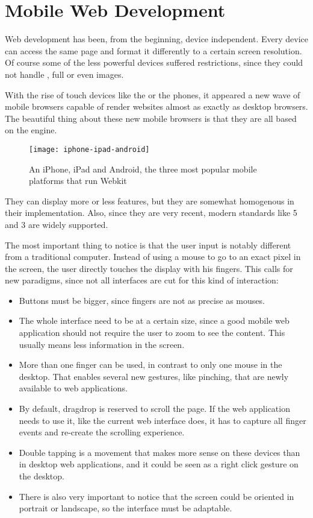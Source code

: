\section{Mobile Web Development} %
\label{sec:mobile}

Web development has been, from the beginning, device independent.
Every device can access the same page and format it differently to a certain screen resolution.
Of course some of the less powerful devices suffered restrictions, since they could not handle , full  or even images.

With the rise of touch devices like the  or the  phones, it appeared a new wave of mobile browsers capable of render websites almost as exactly as desktop browsers.
The beautiful thing about these new mobile browsers is that they are all based on the  engine.

\begin{figure}[htbp]
  \centering
    \texttt{[image: iphone-ipad-android]}
  \caption[Mobile devices with Webkit]{An iPhone, iPad and Android, the three most popular mobile platforms that run Webkit}
  \label{fig:iphone-ipad-android}
\end{figure}

They can display more or less features, but they are somewhat homogenous in their implementation.
Also, since they are very recent, modern standards like 5 and 3 are widely supported.

The most important thing to notice is that the user input is notably different from a traditional computer.
Instead of using a mouse to go to an exact pixel in the screen, the user directly touches the display with his fingers.
This calls for new paradigms, since not all interfaces are cut for this kind of interaction:

\begin{itemize}
  \item Buttons must be bigger, since fingers are not as precise as mouses.
  \item The whole interface need to be at a certain size, since a good mobile web application should not require the user to zoom to see the content.
  This usually means less information in the screen.
  \item More than one finger can be used, in contrast to only one mouse in the desktop.
  That enables several new gestures, like pinching, that are newly available to web applications.
  \item By default, drag\et{}drop is reserved to scroll the page.
  If the web application needs to use it, like the current web interface does, it has to capture all finger events and re-create the scrolling experience.
  \item Double tapping is a movement that makes more sense on these devices than in desktop web applications, and it could be seen as a right click gesture on the desktop.
  \item There is also very important to notice that the screen could be oriented in portrait or landscape, so the interface must be adaptable.
\end{itemize}

